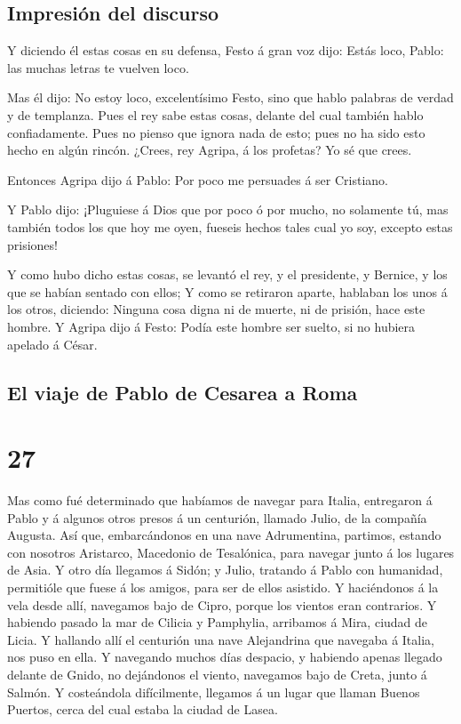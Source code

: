 \hypertarget{impresiuxf3n-del-discurso}{%
\subsection{Impresión del discurso}\label{impresiuxf3n-del-discurso}}

 Y diciendo él estas cosas en su defensa, Festo á gran voz
dijo: Estás loco, Pablo: las muchas letras te vuelven loco.

 Mas él dijo: No estoy loco, excelentísimo Festo, sino que
hablo palabras de verdad y de templanza.  Pues el rey sabe
estas cosas, delante del cual también hablo confiadamente. Pues no
pienso que ignora nada de esto; pues no ha sido esto hecho en algún
rincón.  ¿Crees, rey Agripa, á los profetas? Yo sé que
crees.

 Entonces Agripa dijo á Pablo: Por poco me persuades á ser
Cristiano.

 Y Pablo dijo: ¡Pluguiese á Dios que por poco ó por mucho,
no solamente tú, mas también todos los que hoy me oyen, fueseis hechos
tales cual yo soy, excepto estas prisiones!

 Y como hubo dicho estas cosas, se levantó el rey, y el
presidente, y Bernice, y los que se habían sentado con ellos;
 Y como se retiraron aparte, hablaban los unos á los otros,
diciendo: Ninguna cosa digna ni de muerte, ni de prisión, hace este
hombre.  Y Agripa dijo á Festo: Podía este hombre ser
suelto, si no hubiera apelado á César.

\hypertarget{el-viaje-de-pablo-de-cesarea-a-roma}{%
\subsection{El viaje de Pablo de Cesarea a
Roma}\label{el-viaje-de-pablo-de-cesarea-a-roma}}

\hypertarget{section-26}{%
\section{27}\label{section-26}}

 Mas como fué determinado que habíamos de navegar para
Italia, entregaron á Pablo y á algunos otros presos á un centurión,
llamado Julio, de la compañía Augusta.  Así que,
embarcándonos en una nave Adrumentina, partimos, estando con nosotros
Aristarco, Macedonio de Tesalónica, para navegar junto á los lugares de
Asia.  Y otro día llegamos á Sidón; y Julio, tratando á
Pablo con humanidad, permitióle que fuese á los amigos, para ser de
ellos asistido.  Y haciéndonos á la vela desde allí,
navegamos bajo de Cipro, porque los vientos eran contrarios.
 Y habiendo pasado la mar de Cilicia y Pamphylia, arribamos
á Mira, ciudad de Licia.  Y hallando allí el centurión una
nave Alejandrina que navegaba á Italia, nos puso en ella.  Y
navegando muchos días despacio, y habiendo apenas llegado delante de
Gnido, no dejándonos el viento, navegamos bajo de Creta, junto á Salmón.
 Y costeándola difícilmente, llegamos á un lugar que llaman
Buenos Puertos, cerca del cual estaba la ciudad de Lasea.

